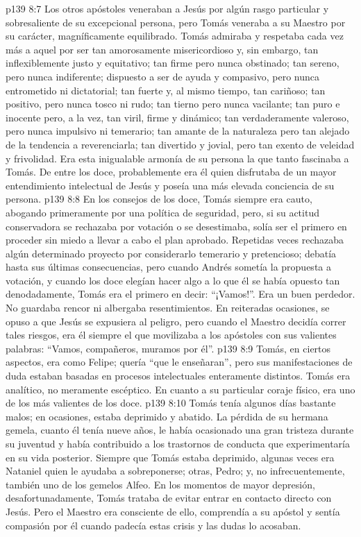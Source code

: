 \vs p139 8:7 \pc Los otros apóstoles veneraban a Jesús por algún rasgo particular y sobresaliente de su excepcional persona, pero Tomás veneraba a su Maestro por su carácter, magníficamente equilibrado. Tomás admiraba y respetaba cada vez más a aquel por ser tan amorosamente misericordioso y, sin embargo, tan inflexiblemente justo y equitativo; tan firme pero nunca obstinado; tan sereno, pero nunca indiferente; dispuesto a ser de ayuda y compasivo, pero nunca entrometido ni dictatorial; tan fuerte y, al mismo tiempo, tan cariñoso; tan positivo, pero nunca tosco ni rudo; tan tierno pero nunca vacilante; tan puro e inocente pero, a la vez, tan viril, firme y dinámico; tan verdaderamente valeroso, pero nunca impulsivo ni temerario; tan amante de la naturaleza pero tan alejado de la tendencia a reverenciarla; tan divertido y jovial, pero tan exento de veleidad y frivolidad. Era esta inigualable armonía de su persona la que tanto fascinaba a Tomás. De entre los doce, probablemente era él quien disfrutaba de un mayor entendimiento intelectual de Jesús y poseía una más elevada conciencia de su persona.
\vs p139 8:8 \pc En los consejos de los doce, Tomás siempre era cauto, abogando primeramente por una política de seguridad, pero, si su actitud conservadora se rechazaba por votación o se desestimaba, solía ser el primero en proceder sin miedo a llevar a cabo el plan aprobado. Repetidas veces rechazaba algún determinado proyecto por considerarlo temerario y pretencioso; debatía hasta sus últimas consecuencias, pero cuando Andrés sometía la propuesta a votación, y cuando los doce elegían hacer algo a lo que él se había opuesto tan denodadamente, Tomás era el primero en decir: “¡Vamos!”. Era un buen perdedor. No guardaba rencor ni albergaba resentimientos. En reiteradas ocasiones, se opuso a que Jesús se expusiera al peligro, pero cuando el Maestro decidía correr tales riesgos, era él siempre el que movilizaba a los apóstoles con sus valientes palabras: “Vamos, compañeros, muramos por él”.
\vs p139 8:9 Tomás, en ciertos aspectos, era como Felipe; quería “que le enseñaran”, pero sus manifestaciones de duda estaban basadas en procesos intelectuales enteramente distintos. Tomás era analítico, no meramente escéptico. En cuanto a su particular coraje físico, era uno de los más valientes de los doce.
\vs p139 8:10 \pc Tomás tenía algunos días bastante malos; en ocasiones, estaba deprimido y abatido. La pérdida de su hermana gemela, cuanto él tenía nueve años, le había ocasionado una gran tristeza durante su juventud y había contribuido a los trastornos de conducta que experimentaría en su vida posterior. Siempre que Tomás estaba deprimido, algunas veces era Nataniel quien le ayudaba a sobreponerse; otras, Pedro; y, no infrecuentemente, también uno de los gemelos Alfeo. En los momentos de mayor depresión, desafortunadamente, Tomás trataba de evitar entrar en contacto directo con Jesús. Pero el Maestro era consciente de ello, comprendía a su apóstol y sentía compasión por él cuando padecía estas crisis y las dudas lo acosaban.
